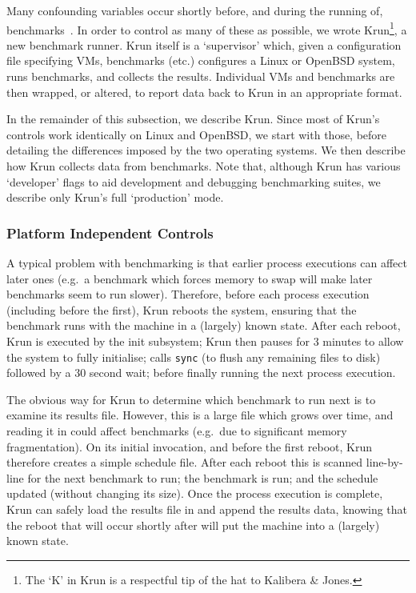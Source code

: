\documentclass[acmlarge]{acmart}\settopmatter{printfolios=true}
\newcommand{\kalibera}{Kalibera \& Jones\xspace}
\newcommand{\krun}{Krun\xspace}
\begin{document}
Many confounding variables occur shortly before, and during the running of,
benchmarks~\cite{kalibera05precision}. In order to control as many of these as possible, we wrote
\krun\footnote{The `K' in Krun is a respectful tip of the hat to \kalibera.}, a new benchmark runner. \krun itself is a `supervisor'
which, given a configuration file specifying VMs, benchmarks (etc.) configures
a Linux or OpenBSD system, runs benchmarks, and collects the results. Individual VMs and benchmarks
are then wrapped, or altered, to report data back to \krun in an appropriate format.

In the remainder of this subsection, we describe \krun. Since most of \krun's
controls work identically on Linux and OpenBSD, we start with those,
before detailing the differences imposed by the two operating systems. We then
describe how \krun collects data from benchmarks.
Note that, although \krun has various `developer' flags to aid development
and debugging benchmarking suites, we describe only \krun's full `production' mode.


\subsubsection{Platform Independent Controls}

A typical problem with benchmarking is that earlier process executions can
affect later ones (e.g.~a benchmark which forces memory to swap will make
later benchmarks seem to run slower). Therefore, before each process execution
(including before the first), \krun reboots the system, ensuring that the
benchmark runs with the machine in a (largely) known state. After each reboot, \krun is
executed by the init subsystem; \krun then pauses for 3
minutes to allow the system to fully initialise; calls \texttt{sync} (to
flush any remaining files to disk) followed by a 30 second wait; before finally running the
next process execution.

The obvious way for \krun to determine which benchmark to run next is to examine
its results file. However, this is a large file which grows over time, and
reading it in could affect benchmarks (e.g.~due to significant memory
fragmentation). On its initial invocation, and before the first reboot, \krun
therefore creates a simple schedule file. After each reboot this is scanned
line-by-line for the next benchmark to run; the benchmark is run; and the schedule
updated (without changing its size). Once the process execution is
complete, \krun can safely load the results file in and append the results data,
knowing that the reboot that will occur shortly after will put the machine into
a (largely) known state.
\end{document}
